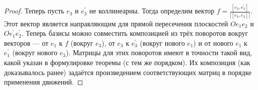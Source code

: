 \begin{proof}
    Теперь пусть $e_3$ и $e_3^\prime$ не коллинеарны. Тогда определим вектор $\displaystyle f = \frac{[e_3, e_3^\prime]}{|[e_3, e_3^\prime]|}$. Этот вектор является направляющим для прямой пересечения плоскостей $Oe_1e_2$ и $Oe_1^\prime e_2^\prime$. Теперь базисы можно совместить композицией из трёх поворотов вокруг векторов --- от $e_1$ к $f$ (вокруг $e_3$), от $e_3$ к $e_3^\prime$ (вокруг нового $e_1$) и от нового $e_1$ к $e_1^\prime$ (вокруг нового $e_3$). Матрицы для этих поворотов имеют в точности такой вид, какой указан в формулировке теоремы (с тем же порядком). Их композиция (как доказывалось ранее) задаётся произведением соответствующих матриц в порядке применения движений.
\end{proof}



